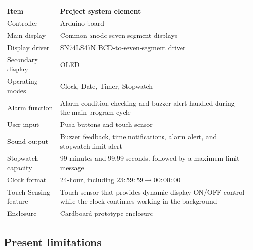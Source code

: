 \documentclass[12pt,letterpaper]{article}
\begin{document}
\begin{center}

\small

\begin{tabularx}{
0.88\textwidth
}{
@{}p{42mm}Y@{}
}

\toprule

\textbf{Item}
&
  \textbf{Project system element}
\\

\midrule

Controller
&
Arduino board
\\

Main display
&
Common-anode seven-segment displays
\\

Display driver
&
SN74LS47N BCD-to-seven-segment driver
\\

Secondary display
&
OLED
\\

Operating modes
&
Clock,
Date,
Timer,
Stopwatch
\\

Alarm function
&
Alarm condition checking and buzzer alert handled during the main program cycle
\\

User input
&
Push buttons and touch sensor
\\

Sound output
&
Buzzer feedback, time notifications, alarm alert, and stopwatch-limit alert
\\

Stopwatch capacity
&
99 minutes and 99.99 seconds, followed by a maximum-limit message
\\

Clock format
&
24-hour,
including
\(23{:}59{:}59
\rightarrow
00{:}00{:}00\)
\\

Touch Sensing feature
&
Touch sensor that provides dynamic display ON/OFF control while the clock continues working in the background
\\

Enclosure
&
Cardboard prototype enclosure
\\

\bottomrule

\end{tabularx}

\end{center}

\normalsize

\subsection{Present limitations}
\end{document}
